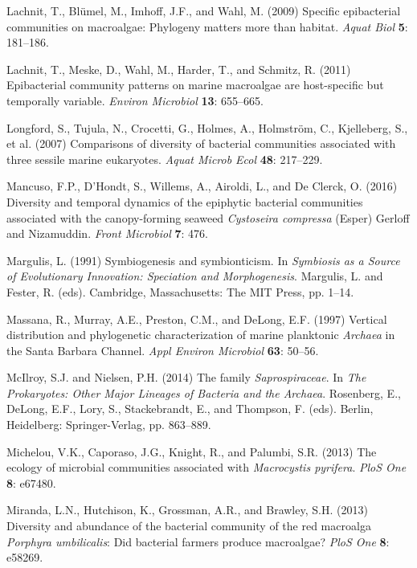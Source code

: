 \documentclass[12pt,]{article}
\begin{document}
\leavevmode\hypertarget{ref-Lachnit2009}{}%
Lachnit, T., Blümel, M., Imhoff, J.F., and Wahl, M. (2009) Specific
epibacterial communities on macroalgae: Phylogeny matters more than
habitat. \emph{Aquat Biol} \textbf{5}: 181--186.

\leavevmode\hypertarget{ref-Lachnit2011}{}%
Lachnit, T., Meske, D., Wahl, M., Harder, T., and Schmitz, R. (2011)
Epibacterial community patterns on marine macroalgae are host-specific
but temporally variable. \emph{Environ Microbiol} \textbf{13}: 655--665.

\leavevmode\hypertarget{ref-Longford2007}{}%
Longford, S., Tujula, N., Crocetti, G., Holmes, A., Holmström, C.,
Kjelleberg, S., et al. (2007) Comparisons of diversity of bacterial
communities associated with three sessile marine eukaryotes. \emph{Aquat
Microb Ecol} \textbf{48}: 217--229.

\leavevmode\hypertarget{ref-Mancuso2016}{}%
Mancuso, F.P., D'Hondt, S., Willems, A., Airoldi, L., and De Clerck, O.
(2016) Diversity and temporal dynamics of the epiphytic bacterial
communities associated with the canopy-forming seaweed \emph{Cystoseira
compressa} (Esper) Gerloff and Nizamuddin. \emph{Front Microbiol}
\textbf{7}: 476.

\leavevmode\hypertarget{ref-Margulis1991}{}%
Margulis, L. (1991) Symbiogenesis and symbionticism. In \emph{Symbiosis
as a Source of Evolutionary Innovation: Speciation and Morphogenesis}.
Margulis, L. and Fester, R. (eds). Cambridge, Massachusetts: The MIT
Press, pp. 1--14.

\leavevmode\hypertarget{ref-Massana1997}{}%
Massana, R., Murray, A.E., Preston, C.M., and DeLong, E.F. (1997)
Vertical distribution and phylogenetic characterization of marine
planktonic \emph{Archaea} in the Santa Barbara Channel. \emph{Appl
Environ Microbiol} \textbf{63}: 50--56.

\leavevmode\hypertarget{ref-McIlroy2014}{}%
McIlroy, S.J. and Nielsen, P.H. (2014) The family \emph{Saprospiraceae}.
In \emph{The Prokaryotes: Other Major Lineages of Bacteria and the
Archaea}. Rosenberg, E., DeLong, E.F., Lory, S., Stackebrandt, E., and
Thompson, F. (eds). Berlin, Heidelberg: Springer-Verlag, pp. 863--889.

\leavevmode\hypertarget{ref-Michelou2013}{}%
Michelou, V.K., Caporaso, J.G., Knight, R., and Palumbi, S.R. (2013) The
ecology of microbial communities associated with \emph{Macrocystis
pyrifera}. \emph{PloS One} \textbf{8}: e67480.

\leavevmode\hypertarget{ref-Miranda2013}{}%
Miranda, L.N., Hutchison, K., Grossman, A.R., and Brawley, S.H. (2013)
Diversity and abundance of the bacterial community of the red macroalga
\emph{Porphyra umbilicalis}: Did bacterial farmers produce macroalgae?
\emph{PloS One} \textbf{8}: e58269.
\end{document}

